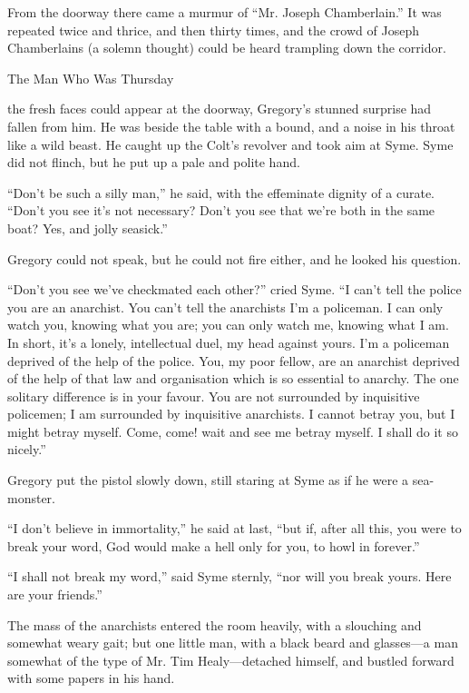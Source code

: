 From the doorway there came a murmur of “Mr. Joseph Chamberlain.” It was repeated twice and thrice, and then thirty times, and the crowd of Joseph Chamberlains (a solemn thought) could be heard trampling down the corridor.

\chap[manwho] The Man Who Was Thursday

 the fresh faces could appear at the doorway, Gregory’s stunned surprise had fallen from him. He was beside the table with a bound, and a noise in his throat like a wild beast. He caught up the Colt’s revolver and took aim at Syme. Syme did not flinch, but he put up a pale and polite hand.

“Don’t be such a silly man,” he said, with the effeminate dignity of a curate. “Don’t you see it’s not necessary? Don’t you see that we’re both in the same boat? Yes, and jolly seasick.”

Gregory could not speak, but he could not fire either, and he looked his question.

“Don’t you see we’ve checkmated each other?” cried Syme. “I can’t tell the police you are an anarchist. You can’t tell the anarchists I’m a policeman. I can only watch you, knowing what you are; you can only watch me, knowing what I am. In short, it’s a lonely, intellectual duel, my head against yours. I’m a policeman deprived of the help of the police. You, my poor fellow, are an anarchist deprived of the help of that law and organisation which is so essential to anarchy. The one solitary difference is in your favour. You are not surrounded by inquisitive policemen; I am surrounded by inquisitive anarchists. I cannot betray you, but I might betray myself. Come, come! wait and see me betray myself. I shall do it so nicely.”

Gregory put the pistol slowly down, still staring at Syme as if he were a sea-monster.

“I don’t believe in immortality,” he said at last, “but if, after all this, you were to break your word, God would make a hell only for you, to howl in forever.”

“I shall not break my word,” said Syme sternly, “nor will you break yours. Here are your friends.”

The mass of the anarchists entered the room heavily, with a slouching and somewhat weary gait; but one little man, with a black beard and glasses⁠—a man somewhat of the type of Mr. Tim Healy⁠—detached himself, and bustled forward with some papers in his hand.

